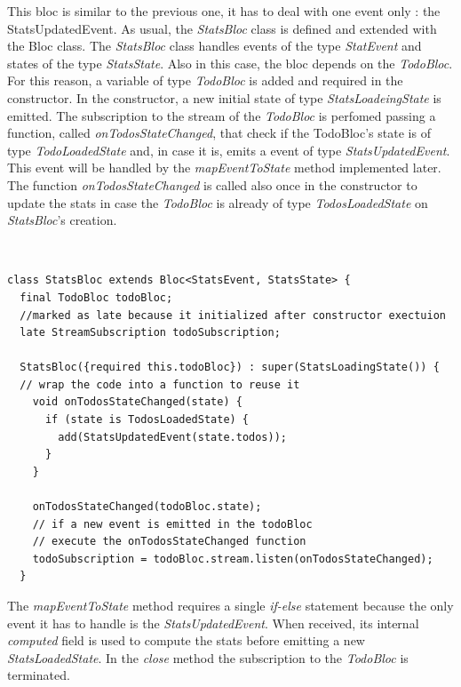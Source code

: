 This bloc is similar to the previous one,  it has to deal with one event only : the StatsUpdatedEvent. As usual, the \textit{StatsBloc} class is defined and extended with the Bloc class. The \textit{StatsBloc} class handles events of the type \textit{StatEvent} and states of the type \textit{StatsState}. Also in this case, the bloc depends on the \textit{TodoBloc}. For this reason, a variable of type \textit{TodoBloc} is added and required in the constructor. In the constructor, a new initial state of type \textit{StatsLoadeingState} is emitted. The subscription to the stream of the \textit{TodoBloc} is perfomed passing a function, called \textit{onTodosStateChanged}, that check if the TodoBloc’s state is of type \textit{TodoLoadedState} and,  in case it is, emits a event of type \textit{StatsUpdatedEvent}. This event will be handled by the \textit{mapEventToState} method implemented later. The function \textit{onTodosStateChanged} is called also once in the constructor to update the stats in case the \textit{TodoBloc} is already of type \textit{TodosLoadedState} on \textit{StatsBloc}'s creation.
\begin{code}
\mbox{}\\
 \mbox{}
\label{code:2.14}
\begin{verbatim}
class StatsBloc extends Bloc<StatsEvent, StatsState> {
  final TodoBloc todoBloc;
  //marked as late because it initialized after constructor exectuion
  late StreamSubscription todoSubscription;

  StatsBloc({required this.todoBloc}) : super(StatsLoadingState()) {
  // wrap the code into a function to reuse it
    void onTodosStateChanged(state) {
      if (state is TodosLoadedState) {
        add(StatsUpdatedEvent(state.todos));
      }
    }

    onTodosStateChanged(todoBloc.state);
 	// if a new event is emitted in the todoBloc
 	// execute the onTodosStateChanged function
    todoSubscription = todoBloc.stream.listen(onTodosStateChanged);
  }
\end{verbatim}
\mbox{}
\end{code}

The \textit{mapEventToState} method requires a single \textit{if-else} statement because the only event it has to handle is the \textit{StatsUpdatedEvent}. When received, its internal \textit{computed }field is used to compute the stats before emitting a new \textit{StatsLoadedState}. 
In the \textit{close} method the subscription to the \textit{TodoBloc} is terminated.

